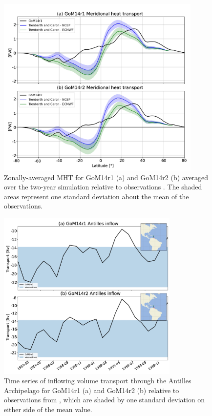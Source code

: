 \begin{figure}[h]
\centerline{\includegraphics[width=0.9\textwidth]{figures/scgsr/mht_gom14.jpg}}
    \caption{Zonally-averaged MHT for GoM14r1 (a) and GoM14r2 (b) averaged over the two-year simulation relative to observations \citep[see][]{trenberth2001estimates}. The shaded areas represent one standard deviation about the mean of the observations.}
    \label{fig:mht}
\end{figure}

\begin{figure}[h]
\centerline{\includegraphics[width=0.8\textwidth]{figures/scgsr/antilles_inflow.jpg}}
    \caption{Time series of inflowing volume transport through the Antilles Archipelago for GoM14r1 (a) and GoM14r2 (b) relative to observations from \citet{johns2002atlantic}, which are shaded by one standard deviation on either side of the mean value.}
    \label{fig:antilles}
\end{figure}

